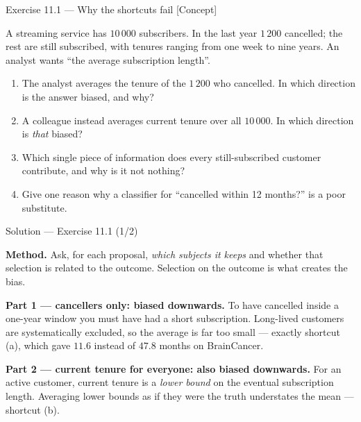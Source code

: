 \documentclass[aspectratio=169,11pt]{beamer}
\begin{document}
\begin{frame}{Exercise 11.1 --- Why the shortcuts fail [Concept]}
\begin{exercise}
  A streaming service has $10\,000$ subscribers. In the last year $1\,200$ cancelled;
  the rest are still subscribed, with tenures ranging from one week to nine years.
  An analyst wants ``the average subscription length''.
  \begin{enumerate}
    \item The analyst averages the tenure of the $1\,200$ who cancelled. In which
          direction is the answer biased, and why?
    \item A colleague instead averages current tenure over all $10\,000$. In which
          direction is \emph{that} biased?
    \item Which single piece of information does every still-subscribed customer
          contribute, and why is it not nothing?
    \item Give one reason why a classifier for ``cancelled within 12 months?'' is a
          poor substitute.
  \end{enumerate}
\end{exercise}
\end{frame}

\begin{frame}{Solution --- Exercise 11.1 (1/2)}
\begin{solutionbox}
  \textbf{Method.} Ask, for each proposal, \emph{which subjects it keeps} and whether that
  selection is related to the outcome. Selection on the outcome is what creates the bias.

  \medskip
  \textbf{Part 1 --- cancellers only: biased downwards.} To have cancelled inside a
  one-year window you must have had a short subscription. Long-lived customers are
  systematically excluded, so the average is far too small --- exactly shortcut (a),
  which gave $11.6$ instead of $47.8$ months on BrainCancer.

  \medskip
  \textbf{Part 2 --- current tenure for everyone: also biased downwards.} For an active
  customer, current tenure is a \emph{lower bound} on the eventual subscription length.
  Averaging lower bounds as if they were the truth understates the mean --- shortcut (b).
\end{solutionbox}
\end{frame}
\end{document}
